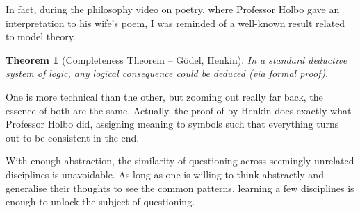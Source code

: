 \documentclass[british,a4paper,]{article}
\newtheorem{theorem}{Theorem}
\theoremstyle{definition}
\theoremstyle{remark}
\begin{document}
In fact, during the philosophy video on poetry, where Professor Holbo gave an interpretation to his wife's poem,
I was reminded of a well-known result related to model theory.
\begin{theorem}[Completeness Theorem -- Gödel, Henkin] \label{complete}
    In a standard deductive system of logic, any logical consequence could be deduced (via formal proof).
\end{theorem}
One is more technical than the other, but zooming out really far back, the essence of both are the same.
Actually, the proof of  by Henkin\autocite{henkin} does exactly what Professor Holbo did,
assigning meaning to symbols such that everything turns out to be consistent in the end.

With enough abstraction, the similarity of questioning across seemingly unrelated disciplines is unavoidable.
As long as one is willing to think abstractly and generalise their thoughts to see the common patterns,
learning a few disciplines is enough to unlock the subject of questioning.

\printbibliography
\end{document}
